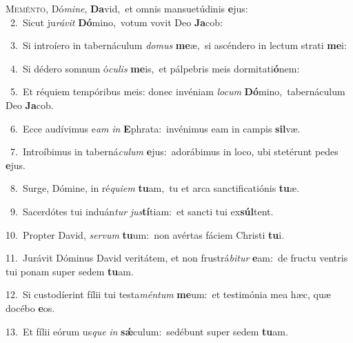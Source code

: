 \lettrine{\initial\textcolor{\initialcolor}{M}}{eménto,} Dó\-\textit{mi}\-\textit{ne}, \textbf{Da}\-vid,~\star et omnis mansuetúdinis \textbf{e}\-jus:\\
{\numbfont\textcolor{\numbcolor}{~2.}}~Sicut ju\-\textit{rá}\-\textit{vit} \textbf{Dó}\-mino,~\star votum vovit Deo \textbf{Ja}\-cob:\par
{\numbfont\textcolor{\numbcolor}{~3.}}~Si introíero in tabernáculum \textit{do}\-\textit{mus} \textbf{me}\-æ,~\star si ascéndero in lectum strati \textbf{me}\-i:\par
{\numbfont\textcolor{\numbcolor}{~4.}}~Si dédero somnum ó\-\textit{cu}\-\textit{lis} \textbf{me}\-is,~\star et pálpebris meis dormitati\-\textbf{ó}\-nem:\par
{\numbfont\textcolor{\numbcolor}{~5.}}~Et réquiem tempóribus meis: donec invéniam \textit{lo}\-\textit{cum} \textbf{Dó}\-mino,~\star tabernáculum Deo \textbf{Ja}\-cob.\par
{\numbfont\textcolor{\numbcolor}{~6.}}~Ecce audívimus e\textit{am} \textit{in} \textbf{E}\-phrata:~\star invénimus eam in campis \textbf{sil}\-væ.\par
{\numbfont\textcolor{\numbcolor}{~7.}}~Introíbimus in taberná\-\textit{cu}\-\textit{lum} \textbf{e}\-jus:~\star adorábimus in loco, ubi stetérunt pedes \textbf{e}\-jus.\par
{\numbfont\textcolor{\numbcolor}{~8.}}~Surge, Dómine, in ré\-\textit{qui}\-\textit{em} \textbf{tu}\-am,~\star tu et arca sanctificatiónis \textbf{tu}\-æ.\par
{\numbfont\textcolor{\numbcolor}{~9.}}~Sacerdótes tui induán\textit{tur} \textit{jus}\-\textbf{tí}tiam:~\star et sancti tui ex\-\textbf{súl}\-tent.\par
{\numbfont\textcolor{\numbcolor}{10.}}~Propter David, \textit{ser}\-\textit{vum} \textbf{tu}\-um:~\star non avértas fáciem Christi \textbf{tu}\-i.\par
{\numbfont\textcolor{\numbcolor}{11.}}~Jurávit Dóminus David veritátem, et non frustrá\-\textit{bi}\-\textit{tur} \textbf{e}\-am:~\star de fructu ventris tui ponam super sedem \textbf{tu}\-am.\par
{\numbfont\textcolor{\numbcolor}{12.}}~Si custodíerint fílii tui testa\-\textit{mén}\-\textit{tum} \textbf{me}\-um:~\star et testimónia mea hæc, quæ docébo \textbf{e}\-os.\par
{\numbfont\textcolor{\numbcolor}{13.}}~Et fílii eórum us\textit{que} \textit{in} \textbf{sǽ}\-culum:~\star sedébunt super sedem \textbf{tu}\-am.\par
